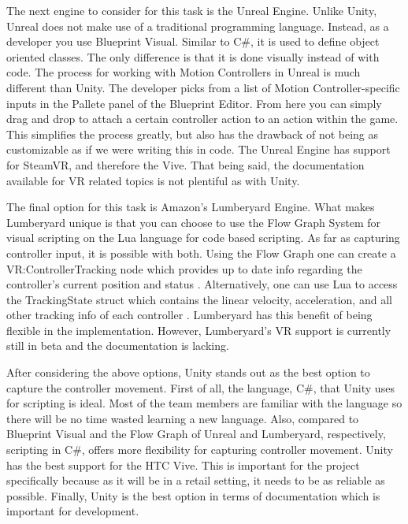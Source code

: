 \documentclass[10pt,journal,compsoc,onecolumn, draftclsnofoot]{IEEEtran}
\begin{document}
The next engine to consider for this task is the Unreal Engine.
Unlike Unity, Unreal does not make use of a traditional programming language.
Instead, as a developer you use Blueprint Visual.
Similar to C\#, it is used to define object oriented classes.
The only difference is that it is done visually instead of with code.
The process for working with Motion Controllers in Unreal is much different than Unity.
The developer picks from a list of Motion Controller-specific inputs in the Pallete panel of the Blueprint Editor\cite{unreal_controller}.
From here you can simply drag and drop to attach a certain controller action to an action within the game.
This simplifies the process greatly, but also has the drawback of not being as customizable as if we were writing this in code.
The Unreal Engine has support for SteamVR, and therefore the Vive.
That being said, the documentation available for VR related topics is not plentiful as with Unity.

The final option for this task is Amazon's Lumberyard Engine.
What makes Lumberyard unique is that you can choose to use the Flow Graph System for visual scripting on the Lua language for code based scripting.
As far as capturing controller input, it is possible with both.
Using the Flow Graph one can create a VR:ControllerTracking node which provides up to date info regarding the controller's current position and status \cite{lumberyard_controller_flow}.
Alternatively, one can use Lua to access the TrackingState struct which contains the linear velocity, acceleration, and all other tracking info of each controller \cite{lumberyard_controller_lua}.
Lumberyard has this benefit of being flexible in the implementation.
However, Lumberyard's VR support is currently still in beta and the documentation is lacking.

After considering the above options, Unity stands out as the best option to capture the controller movement.
First of all, the language, C\#, that Unity uses for scripting is ideal.
Most of the team members are familiar with the language so there will be no time wasted learning a new language.
Also, compared to Blueprint Visual and the Flow Graph of Unreal and Lumberyard, respectively, scripting in C\#, offers more flexibility for capturing controller movement.
Unity has the best support for the HTC Vive.
This is important for the project specifically because as it will be in a retail setting, it needs to be as reliable as possible.
Finally, Unity is the best option in terms of documentation which is important for development.
\end{document}

